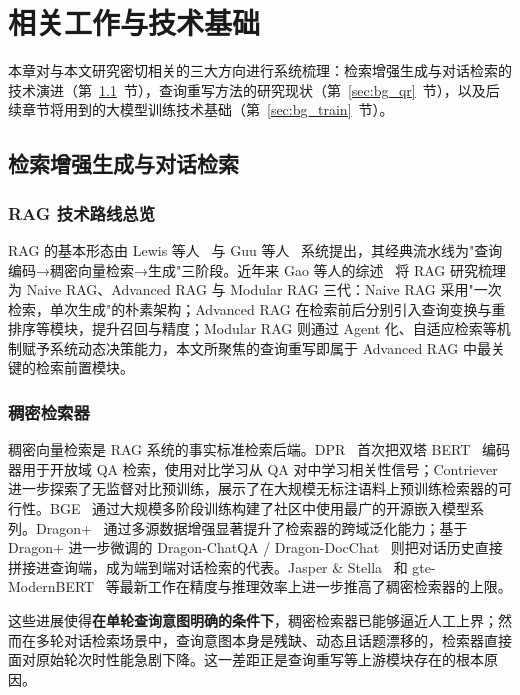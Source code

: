\chapter{相关工作与技术基础}
\label{chap:background}

本章对与本文研究密切相关的三大方向进行系统梳理：检索增强生成与对话检索的技术演进（第~\ref{sec:bg_rag}~节），查询重写方法的研究现状（第~\ref{sec:bg_qr}~节），以及后续章节将用到的大模型训练技术基础（第~\ref{sec:bg_train}~节）。

\section{检索增强生成与对话检索}
\label{sec:bg_rag}

\subsection{RAG 技术路线总览}

RAG 的基本形态由 Lewis 等人~\citep{lewis2020rag} 与 Guu 等人~\citep{guu2020realm} 系统提出，其经典流水线为"查询编码→稠密向量检索→生成"三阶段。近年来 Gao 等人的综述~\citep{gao2024retrievalaugmented} 将 RAG 研究梳理为 Naive RAG、Advanced RAG 与 Modular RAG 三代：Naive RAG 采用"一次检索，单次生成"的朴素架构；Advanced RAG 在检索前后分别引入查询变换与重排序等模块，提升召回与精度；Modular RAG 则通过 Agent 化、自适应检索等机制赋予系统动态决策能力，本文所聚焦的查询重写即属于 Advanced RAG 中最关键的检索前置模块。

\subsection{稠密检索器}

稠密向量检索是 RAG 系统的事实标准检索后端。DPR~\citep{karpukhin-etal-2020-dense} 首次把双塔 BERT~\citep{devlin2019bert} 编码器用于开放域 QA 检索，使用对比学习从 QA 对中学习相关性信号；Contriever~\citep{izacard2022contriever} 进一步探索了无监督对比预训练，展示了在大规模无标注语料上预训练检索器的可行性。BGE~\citep{xiao2023cpack} 通过大规模多阶段训练构建了社区中使用最广的开源嵌入模型系列。Dragon+~\citep{lin2023dragon} 通过多源数据增强显著提升了检索器的跨域泛化能力；基于 Dragon+ 进一步微调的 Dragon-ChatQA / Dragon-DocChat~\citep{Liu2024ChatQASG} 则把对话历史直接拼接进查询端，成为端到端对话检索的代表。Jasper \& Stella~\citep{Zhang2024JasperAS} 和 gte-ModernBERT~\citep{warner2024modernbert} 等最新工作在精度与推理效率上进一步推高了稠密检索器的上限。

这些进展使得\textbf{在单轮查询意图明确的条件下}，稠密检索器已能够逼近人工上界；然而在多轮对话检索场景中，查询意图本身是残缺、动态且话题漂移的，检索器直接面对原始轮次时性能急剧下降。这一差距正是查询重写等上游模块存在的根本原因。

